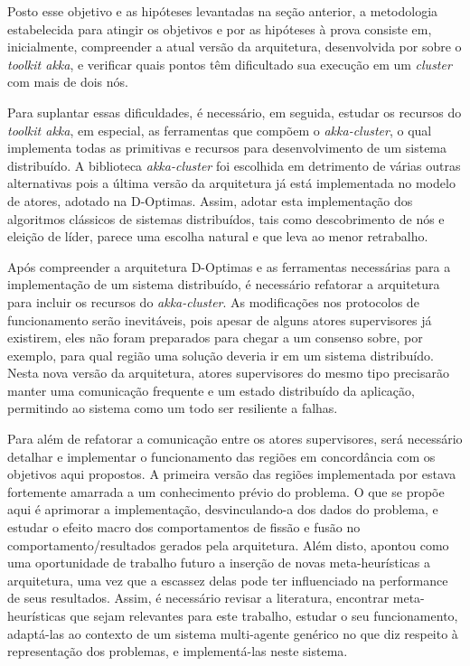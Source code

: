 Posto esse objetivo e as hipóteses levantadas na seção anterior, a metodologia estabelecida para atingir os objetivos e por as hipóteses à prova consiste em, inicialmente, compreender a atual versão da arquitetura, desenvolvida por  sobre o \textit{toolkit akka}, e verificar quais pontos têm dificultado sua execução em um \textit{cluster} com mais de dois nós. 

Para suplantar essas dificuldades, é necessário, em seguida, estudar os recursos do \textit{toolkit akka}, em especial, as ferramentas que compõem o \textit{akka-cluster}, o qual implementa todas as primitivas e recursos para desenvolvimento de um sistema distribuído. A biblioteca \textit{akka-cluster} foi escolhida em detrimento de várias outras alternativas pois a última versão da arquitetura já está implementada no modelo de atores, adotado na D-Optimas. Assim, adotar esta implementação dos algoritmos clássicos de sistemas distribuídos, tais como descobrimento de nós e eleição de líder, parece uma escolha natural e que leva ao menor retrabalho.

Após compreender a arquitetura D-Optimas e as ferramentas necessárias para a implementação de um sistema distribuído, é necessário refatorar a arquitetura para incluir os recursos do \textit{akka-cluster}. As modificações nos protocolos de funcionamento serão inevitáveis, pois apesar de alguns atores supervisores já existirem, eles não foram preparados para chegar a um consenso sobre, por exemplo, para qual região uma solução deveria ir em um sistema distribuído. Nesta nova versão da arquitetura, atores supervisores do mesmo tipo precisarão manter uma comunicação frequente e um estado distribuído da aplicação, permitindo ao sistema como um todo ser resiliente a falhas.

Para além de refatorar a comunicação entre os atores supervisores, será necessário detalhar e implementar o funcionamento das regiões em concordância com os objetivos aqui propostos. A primeira versão das regiões implementada por  estava fortemente amarrada a um conhecimento prévio do problema. O que se propõe aqui é aprimorar a implementação, desvinculando-a dos dados do problema, e estudar o efeito macro dos comportamentos de fissão e fusão no comportamento/resultados gerados pela arquitetura. Além disto,  apontou como uma oportunidade de trabalho futuro a inserção de novas meta-heurísticas a arquitetura, uma vez que a escassez delas pode ter influenciado na performance de seus resultados. Assim, é necessário revisar a literatura, encontrar meta-heurísticas que sejam relevantes para este trabalho, estudar o seu funcionamento, adaptá-las ao contexto de um sistema multi-agente genérico no que diz respeito à representação dos problemas, e implementá-las neste sistema.

